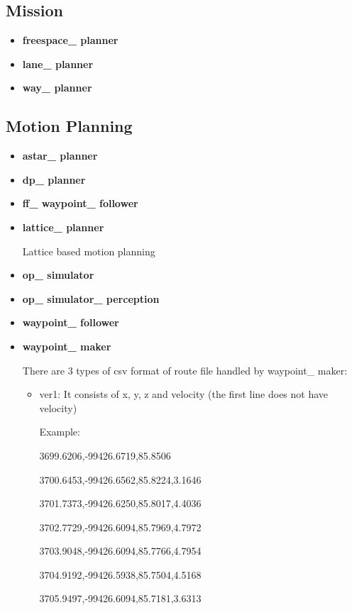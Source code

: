 \documentclass[
10pt, %
a4paper, %
oneside, %
BCOR5mm, %
]{scrartcl}
\begin{document}
\subsection*{Mission}
\begin{itemize}
\item  	\textbf{freespace\_ planner}

\item \textbf{lane\_ planner }

\item \textbf{way\_ planner}
\end{itemize}


\subsection*{Motion Planning} 
\begin{itemize}
 	\item \textbf{astar\_ planner 	}
	\item \textbf{dp\_ planner }	
	\item \textbf{ff\_ waypoint\_ follower }	
	
	\item \textbf{lattice\_ planner}
	
	Lattice based motion planning 	
	\item \textbf{op\_ simulator }	
	\item \textbf{op\_ simulator\_ perception }	
	\item \textbf{waypoint\_ follower} 
	\item \textbf{waypoint\_ maker}
	
	There are 3 types of csv format of route file handled by waypoint\_ maker:
	\begin{itemize}
	\item ver1: It consists of x, y, z and velocity (the first line does not have velocity)
	
	Example:

    3699.6206,-99426.6719,85.8506
    
    3700.6453,-99426.6562,85.8224,3.1646
    
    3701.7373,-99426.6250,85.8017,4.4036
    
    3702.7729,-99426.6094,85.7969,4.7972
    
    3703.9048,-99426.6094,85.7766,4.7954
    
    3704.9192,-99426.5938,85.7504,4.5168
    
    3705.9497,-99426.6094,85.7181,3.6313
    

\end{itemize}
\end{itemize}
\end{document}
